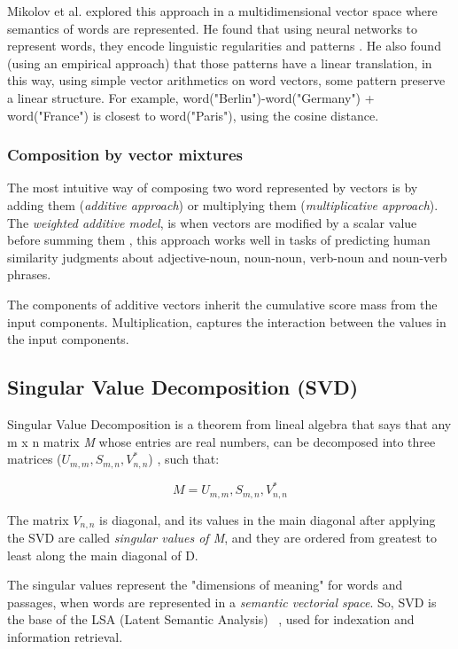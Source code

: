 Mikolov et al. explored this approach in a multidimensional vector space where semantics of words are represented. He found that using neural networks to represent words, they encode linguistic regularities and patterns \cite{compositionality2013Mikolov}. He also found (using an empirical approach) that those patterns have a linear translation, in this way, using simple vector arithmetics on word vectors, some pattern preserve a linear structure. For example, word("Berlin")-word("Germany") + word("France") is closest to word("Paris"), using the cosine distance. 

\subsubsection{Composition by vector mixtures}
The most intuitive way of composing two word represented by vectors is by adding them (\textit{additive approach}) or multiplying them (\textit{multiplicative approach}).  The \textit{weighted additive model}, is when vectors are modified by a scalar value before summing them \cite{mitchell2010composition}, this approach works well in tasks of predicting human similarity judgments about adjective-noun, noun-noun, verb-noun and noun-verb phrases.

   The components of additive vectors inherit the cumulative score mass from the input components. Multiplication, captures the interaction between the values in the input components. 
   

%
\subsection{Singular Value Decomposition (SVD)}
%
Singular Value Decomposition is a theorem from lineal algebra that says  that any m x n matrix  \textit{M} whose entries are real numbers, can be decomposed into three matrices (\textit{$U_{m,m}, S_{m,n}, V_{n,n}^{*}$}) , such that: 

\begin{center}
\begin{equation}
\label{SVD}
M  = U_{m,m}, S_{m,n}, V_{n,n}^{*}
\end{equation}
\end{center}

The matrix \textit{$V_{n,n}$} is diagonal, and its values in the main diagonal after applying the SVD are called \textit{singular values of M}, and they are ordered from greatest to least along the main diagonal of D. 

The singular values represent the "dimensions of meaning" for words and passages, when words are represented in a \textit{semantic vectorial space}. So, SVD is the base of the LSA (Latent Semantic Analysis) ~\cite{landauer1998introduction}, used for indexation and information retrieval. 

